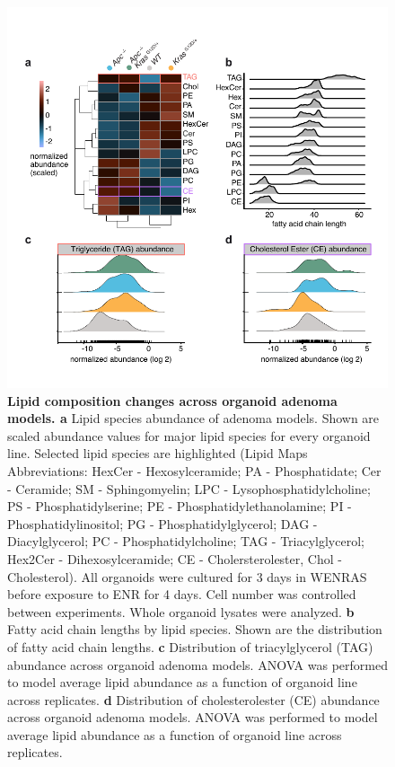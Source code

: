 \begin{flushleft}
\begin{figure}[h]
\centering
\includegraphics[width=350pt,
                height=\textheight,
                keepaspectratio]{figures/adenomaprofiling/pdf/fig_1_6_8.pdf}
\caption[Lipid composition changes across organoid adenoma models]{\textbf{Lipid composition changes across organoid adenoma models. a} Lipid species abundance of adenoma models. Shown are scaled abundance values for major lipid species for every organoid line. Selected lipid species are highlighted (Lipid Maps Abbreviations: HexCer - Hexosylceramide; PA - Phosphatidate; Cer - Ceramide; SM - Sphingomyelin; LPC - Lysophosphatidylcholine; PS - Phosphatidylserine; PE - Phosphatidylethanolamine; PI - Phosphatidylinositol; PG - Phosphatidylglycerol; DAG - Diacylglycerol; PC - Phosphatidylcholine; TAG - Triacylglycerol; Hex2Cer - Dihexosylceramide; CE - Cholersterolester, Chol - Cholesterol). All organoids were cultured for 3 days in WENRAS before exposure to ENR for 4 days. Cell number was controlled between experiments. Whole organoid lysates were analyzed. 
\textbf{b} Fatty acid chain lengths by lipid species. Shown are the distribution of fatty acid chain lengths.
\textbf{c} Distribution of triacylglycerol (TAG) abundance across organoid adenoma models. ANOVA was performed to model average lipid abundance as a function of organoid line across replicates.
\textbf{d} Distribution of cholesterolester (CE) abundance across organoid adenoma models. ANOVA was performed to model average lipid abundance as a function of organoid line across replicates.
}
\label{fig_168}
\end{figure}
\bigbreak



\end{flushleft}
